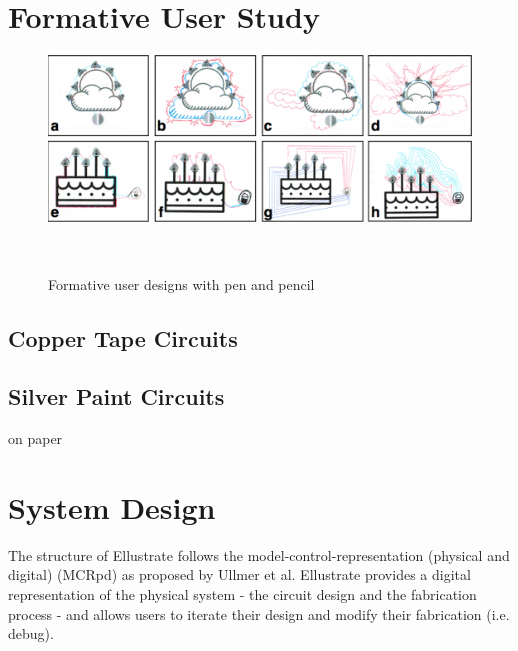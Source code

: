 \documentclass{sigchi}
\begin{document}


\section{Formative User Study}
\begin{figure}
\centering
  \includegraphics[width=1\columnwidth]{figures/Ellustrate_figures_formative_user_design}
  \caption{Formative user designs with pen and pencil}~\label{fig:formative_user_design}
\end{figure}



\subsection{Copper Tape Circuits}
\subsection{Silver Paint Circuits}
on paper


\section{System Design}
The structure of Ellustrate follows the model-control-representation (physical and digital) (MCRpd) as proposed by Ullmer et al. Ellustrate provides a digital representation of the physical system - the circuit design and the fabrication process - and allows users to iterate their design and modify their fabrication (i.e. debug). 
\end{document}
